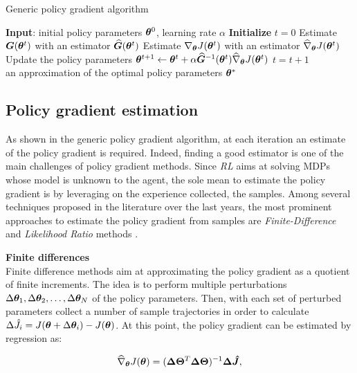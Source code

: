 \begin{algorithm}[t]
	\caption{Generic policy gradient algorithm}
	\label{alg:PG}
	\begin{algorithmic}[1]
	\State \textbf{Input}: initial policy parameters $\boldsymbol{\theta}^0$, learning rate $\alpha$
	\State \textbf{Initialize} $t=0$
		\State Estimate $\boldsymbol{G}(\boldsymbol{\theta}^t)$ with an estimator $\widehat{\boldsymbol{G}}(\boldsymbol{\theta}^t)$
		\State Estimate $\nabla_{\boldsymbol{\theta}}J(\boldsymbol{\theta}^t)$ with an estimator $\widehat{\nabla}_{\boldsymbol{\theta}}J(\boldsymbol{\theta}^t)$ \label{step:PGestimation}
		\State Update the policy parameters $\boldsymbol{\theta}^{t+1} \leftarrow \boldsymbol{\theta}^t+\alpha\widehat{\boldsymbol{G}}^{-1}(\boldsymbol{\theta}^t)\widehat{\nabla}_{\boldsymbol{\theta}}J(\boldsymbol{\theta}^t)$
		\State $t=t+1$
	\EndWhile \\
	\Return an approximation of the optimal policy parameters $\boldsymbol{\theta}^*$
	\end{algorithmic}
\end{algorithm}

\subsection{Policy gradient estimation}
As shown in the generic policy gradient algorithm, at each iteration an estimate of the policy gradient is required. Indeed, finding a good estimator is one of the main challenges of policy gradient methods. Since \emph{RL} aims at solving \gls{MDP}s  whose model is unknown to the agent, the sole mean to estimate the policy gradient is by leveraging on the experience collected, \ie the samples. Among several techniques proposed in the literature over the last years, the most prominent approaches to estimate the policy gradient from samples are \emph{Finite-Difference} and \emph{Likelihood Ratio} methods \cite{glynn1990likelihood}.

\textbf{Finite differences}\\
Finite difference methods aim at approximating the policy gradient as a quotient of finite increments. The idea is to perform multiple perturbations $\Delta\boldsymbol{\theta}_1,\Delta\boldsymbol{\theta}_2, \dots, \Delta\boldsymbol{\theta}_N$ of the policy parameters. Then, with each set of perturbed parameters collect a number of sample trajectories in order to calculate $\Delta\hat{J}_i=J(\boldsymbol{\theta}+\Delta\boldsymbol{\theta}_i)-J(\boldsymbol{\theta})$. At this point, the policy gradient can be estimated by regression as:

\begin{align}
\widehat{\nabla}_{\boldsymbol{\theta}}J(\boldsymbol{\theta})=(\boldsymbol{\Delta\Theta}^T\boldsymbol{\Delta\Theta})^{-1}\boldsymbol{\Delta\hat{J}},
\end{align}

